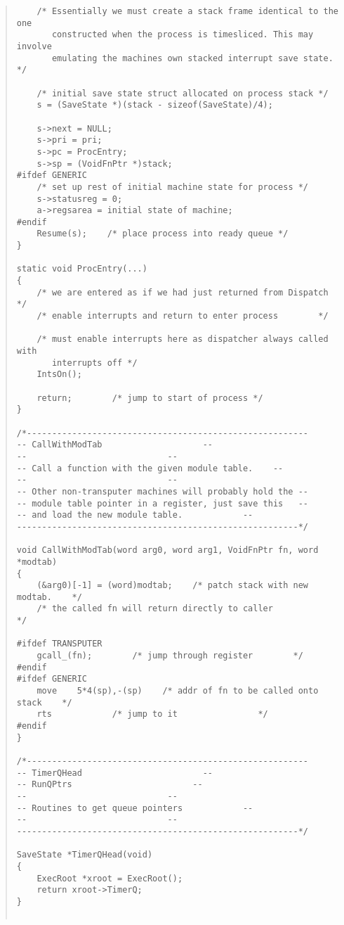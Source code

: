 \begin {quote}
\begin{verbatim}
    /* Essentially we must create a stack frame identical to the one
       constructed when the process is timesliced. This may involve
       emulating the machines own stacked interrupt save state.    */

    /* initial save state struct allocated on process stack */
    s = (SaveState *)(stack - sizeof(SaveState)/4);

    s->next = NULL;
    s->pri = pri;
    s->pc = ProcEntry;
    s->sp = (VoidFnPtr *)stack;
#ifdef GENERIC
    /* set up rest of initial machine state for process */
    s->statusreg = 0;
    a->regsarea = initial state of machine;
#endif
    Resume(s);    /* place process into ready queue */
}

static void ProcEntry(...)
{
    /* we are entered as if we had just returned from Dispatch    */
    /* enable interrupts and return to enter process        */

    /* must enable interrupts here as dispatcher always called with
       interrupts off */
    IntsOn();
    
    return;        /* jump to start of process */
}

/*--------------------------------------------------------
-- CallWithModTab                    --
--                            --
-- Call a function with the given module table.    --
--                            --
-- Other non-transputer machines will probably hold the --
-- module table pointer in a register, just save this   --
-- and load the new module table.            --
--------------------------------------------------------*/

void CallWithModTab(word arg0, word arg1, VoidFnPtr fn, word *modtab)
{
    (&arg0)[-1] = (word)modtab;    /* patch stack with new modtab.    */
    /* the called fn will return directly to caller            */

#ifdef TRANSPUTER
    gcall_(fn);        /* jump through register        */
#endif
#ifdef GENERIC
    move    5*4(sp),-(sp)    /* addr of fn to be called onto stack    */
    rts            /* jump to it                */
#endif
}

/*--------------------------------------------------------
-- TimerQHead                        --
-- RunQPtrs                        --
--                            --
-- Routines to get queue pointers            --
--                            --
--------------------------------------------------------*/

SaveState *TimerQHead(void)
{
    ExecRoot *xroot = ExecRoot();
    return xroot->TimerQ;
}


\end{verbatim}
\end{quote}
